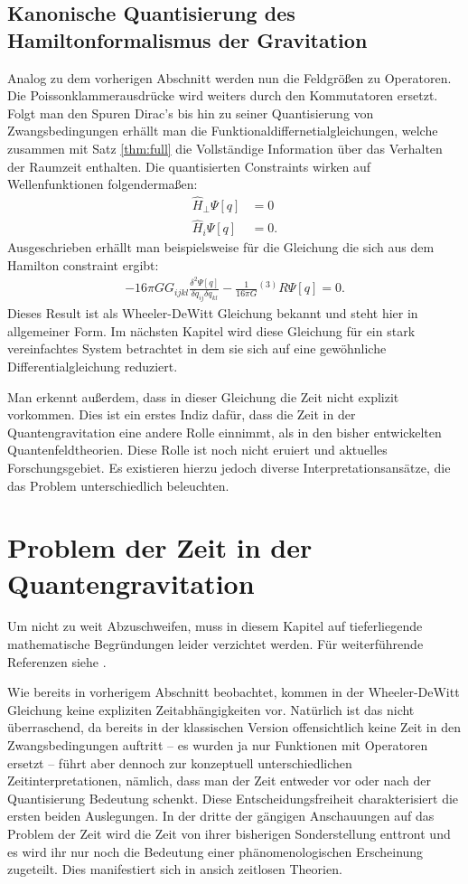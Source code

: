 \documentclass{scrartcl}
\newcommand{\inHS}{{}^{(3)}\!}
\begin{document}
	\subsection{Kanonische Quantisierung des Hamiltonformalismus der Gravitation}
		Analog zu dem vorherigen Abschnitt werden nun die Feldgrößen zu Operatoren.
		Die Poissonklammerausdrücke wird weiters durch den Kommutatoren ersetzt.
		Folgt man den Spuren Dirac's bis hin zu seiner Quantisierung von Zwangsbedingungen \cite{dirac2001lectures}
		erhällt man die Funktionaldiffernetialgleichungen, welche zusammen mit Satz \ref{thm:full} die Vollständige
		Information über das Verhalten der Raumzeit enthalten. Die quantisierten Constraints wirken auf Wellenfunktionen folgendermaßen:
		\begin{align}
			\hat{H}_\perp\Psi[q]&=0\\
			\hat{H}_i\Psi[q]&=0.
		\end{align}
		Ausgeschrieben erhällt man beispielsweise für die Gleichung die sich aus dem Hamilton constraint ergibt:
		\begin{align}
			-16\pi G G_{ijkl}\frac{\delta^2\Psi[q]}{\delta q_{ij}\delta q_{kl}}-\frac{1}{16\pi G}\inHS R\Psi[q]=0.
		\end{align}
		Dieses Result ist als Wheeler-DeWitt Gleichung bekannt und steht hier in allgemeiner Form. Im nächsten Kapitel
		wird diese Gleichung für ein stark vereinfachtes System betrachtet in dem sie sich auf eine gewöhnliche 
		Differentialgleichung reduziert.
		
		Man erkennt außerdem, dass in dieser Gleichung die Zeit nicht explizit vorkommen. Dies ist ein erstes Indiz dafür, dass
		die Zeit in der Quantengravitation eine andere Rolle einnimmt, als in den bisher entwickelten Quantenfeldtheorien.
		Diese Rolle ist noch nicht eruiert und aktuelles Forschungsgebiet. Es existieren hierzu jedoch diverse
		Interpretationsansätze, die das Problem unterschiedlich beleuchten.
	\section{Problem der Zeit in der Quantengravitation}
		Um nicht zu weit Abzuschweifen, muss in diesem Kapitel auf tieferliegende
		mathematische Begründungen leider verzichtet werden. Für weiterführende Referenzen
		siehe \cite{qg06,gr-qc/9210011}.
		
		Wie bereits in vorherigem Abschnitt beobachtet, kommen in der Wheeler-DeWitt Gleichung keine
		expliziten Zeitabhängigkeiten vor. Natürlich ist das nicht überraschend, da bereits in der klassischen Version
		offensichtlich keine Zeit in den Zwangsbedingungen auftritt -- es wurden ja nur Funktionen
		mit Operatoren ersetzt -- führt aber dennoch zur konzeptuell unterschiedlichen Zeitinterpretationen, nämlich,
		dass man der Zeit entweder vor oder nach der Quantisierung Bedeutung schenkt. Diese Entscheidungsfreiheit charakterisiert
		die ersten beiden Auslegungen. In der dritte der gängigen Anschauungen auf das Problem der Zeit 
		wird die Zeit von ihrer bisherigen Sonderstellung enttront und es wird ihr nur noch die Bedeutung
		einer phänomenologischen Erscheinung zugeteilt. Dies manifestiert sich in ansich zeitlosen Theorien.
		
\end{document}

